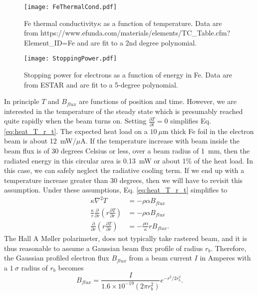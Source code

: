 \documentclass[12pt]{article}
\begin{document}
\begin{figure}[h]
\centering
\texttt{[image: FeThermalCond.pdf]}
\caption{\label{fig:conductivity} Fe thermal conductivity$\kappa$ as a function of temperature. Data are from https://www.efunda.com/materials/elements/TC\_Table.cfm?Element\_ID=Fe and are fit to a 2nd degree polynomial.}
\end{figure}
\begin{figure}[h]
\centering
\texttt{[image: StoppingPower.pdf]}
\caption{\label{fig:stopping}Stopping power for electrons as a function of energy in Fe. Data are from ESTAR and are fit to a 5-degree polynomial.}
\end{figure}
In principle $T$ and $B_{flux}$ are functions of position and time. However, we are interested in the temperature of the steady state which is presumably reached quite rapidly when the beam turns on. Setting $\frac{\partial T}{\partial t}=0$ simplifies Eq. \ref{eq:heat_T_r_t}. The expected heat load on a $10~\mu$m thick Fe foil in the electron beam is about 12~mW/$\mu$A. If the temperature increase with beam inside the beam flux is of 30 degrees Celsius or less, over a beam radius of 1~mm, then the radiated energy in this circular area is 0.13~mW or about 1\% of the heat load. In this case, we can safely neglect the radiative cooling term. If we end up with a temperature increase greater than 30 degrees, then we will have to revisit this assumption. Under these assumptions, Eq. \ref{eq:heat_T_r_t} simplifies to  
\begin{align}
\kappa\nabla^2T&=-\rho\alpha B_{flux}\\
\frac{\kappa}{r}\frac{\partial}{\partial r}\left(r\frac{\partial T}{\partial r}\right)&=-\rho\alpha B_{flux}\\
\label{eq:heat_T_r}
\frac{\partial}{\partial r}\left(r\frac{\partial T}{\partial r}\right)&=-\frac{\rho\alpha}{\kappa}rB_{flux}.
\end{align}
The Hall A M\o ller polarimeter, does not typically take rastered beam, and it is thus reasonable to assume a Gaussian beam flux profile of radius $r_b$. Therefore, the Gaussian profiled electron flux $B_{flux}$ from a beam current $I$ in Amperes with a $1~\sigma$ radius of $r_{b}$ becomes
\begin{equation}
B_{flux}=\frac{I}{1.6\times 10^{-19} \left(2\pi r_{b}^2\right)}e^{-r^2/2r_b^2}.
\end{equation}
\end{document}
